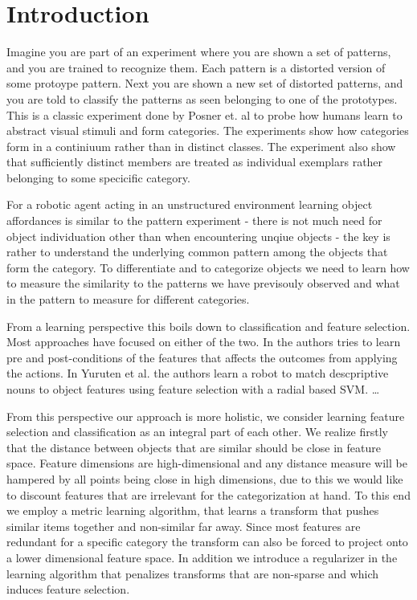 \section{Introduction}\label{introduction}

Imagine you are part of an experiment where you are shown a set of
patterns, and you are trained to recognize them. Each pattern is a
distorted version of some protoype pattern. Next you are shown a new set
of distorted patterns, and you are told to classify the patterns as seen
belonging to one of the prototypes. This is a classic experiment done by
Posner et. al \cite{POSNER:1967ef} to probe how humans learn to abstract
visual stimuli and form categories. The experiments show how categories
form in a continiuum rather than in distinct classes. The experiment
also show that sufficiently distinct members are treated as individual
exemplars rather belonging to some specicific category.

For a robotic agent acting in an unstructured environment learning
object affordances is similar to the pattern experiment - there is not
much need for object individuation other than when encountering unqiue
objects - the key is rather to understand the underlying common pattern
among the objects that form the category. To differentiate and to
categorize objects we need to learn how to measure the similarity to the
patterns we have previsouly observed and what in the pattern to measure
for different categories.

From a learning perspective this boils down to classification and
feature selection. Most approaches have focused on either of the two. In
\cite{Stoytchev:2005il,Chao:2011id,Niekum:us} the authors tries to learn
pre and post-conditions of the features that affects the outcomes from
applying the actions. In Yuruten et al. \cite{Yuruten:2013hr} the
authors learn a robot to match descpriptive nouns to object features
using feature selection with a radial based SVM.
\cite{Stark:2008bx}\ldots{}

From this perspective our approach is more holistic, we consider
learning feature selection and classification as an integral part of
each other. We realize firstly that the distance between objects that
are similar should be close in feature space. Feature dimensions are
high-dimensional and any distance measure will be hampered by all points
being close in high dimensions, due to this we would like to discount
features that are irrelevant for the categorization at hand. To this end
we employ a metric learning algorithm, that learns a transform that
pushes similar items together and non-similar far away. Since most
features are redundant for a specific category the transform can also be
forced to project onto a lower dimensional feature space. In addition we
introduce a regularizer in the learning algorithm that penalizes
transforms that are non-sparse and which induces feature selection.

